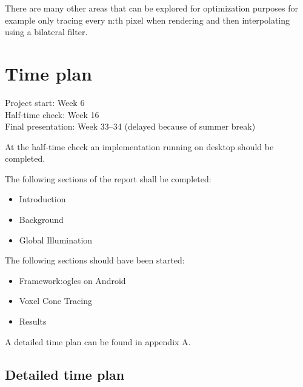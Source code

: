 \documentclass[a4paper, 12pt]{article}
\begin{document}
There are many other areas that can be explored for optimization purposes for example only tracing every n:th pixel when rendering and then interpolating using a bilateral filter. 

\section{Time plan}
\label{sec:Time plan}

Project start: Week 6 \\
Half-time check: Week 16 \\
Final presentation: Week 33--34 (delayed because of summer break)

At the half-time check an implementation running on desktop should be completed.

The following sections of the report shall be completed:
\begin{itemize}
  \item Introduction
  \item Background
  \item Global Illumination
\end{itemize}

The following sections should have been started:
\begin{itemize}
  \item Framework:\@ \gls{ogles} on Android
  \item Voxel Cone Tracing
  \item Results
\end{itemize}

A detailed time plan can be found in appendix A\@.

\begin{refsection}
\nocite{*}
\printbibliography[heading=bibnumbered, title={Literature Base}, subtype=litbase, prefixnumbers={LB}]
\end{refsection}

\printbibliography[heading=bibnumbered, notsubtype=litbase]

\newpage

\begin{appendices}

\section{Detailed time plan}
\label{app:timeplan}



\end{appendices}
\end{document}
